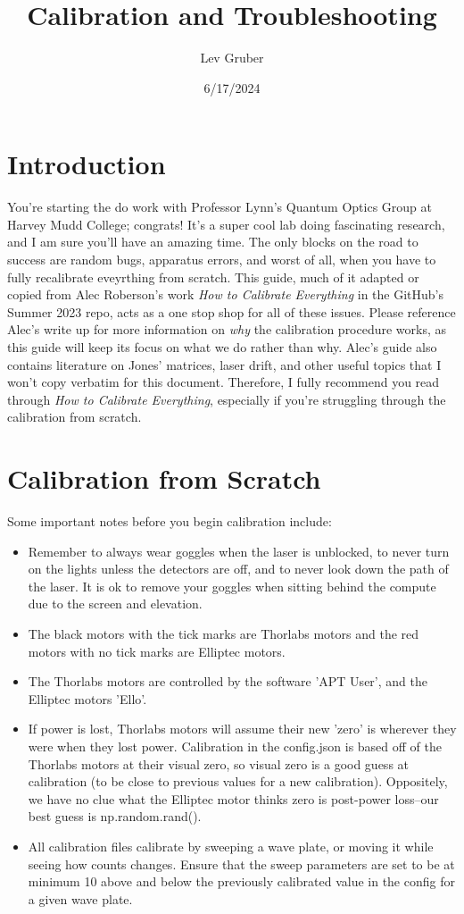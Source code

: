 \documentclass{paper}[11pt]
\title{Calibration and Troubleshooting}
\author{Lev Gruber}
\date{6/17/2024}
\begin{document}
\maketitle 

\tableofcontents
\newpage
\section{Introduction}
You're starting the do work with Professor Lynn's Quantum Optics Group at Harvey Mudd College; congrats! It's a super cool lab doing fascinating research, and I am sure you'll have an amazing time. The only blocks on the road to success are random bugs, apparatus errors, and worst of all, when you have to fully recalibrate eveyrthing from scratch. This guide, much of it adapted or copied from Alec Roberson's work \textit{How to Calibrate Everything} in the GitHub's Summer 2023 repo, acts as a one stop shop for all of these issues. Please reference Alec's write up for more information on \textit{why} the calibration procedure works, as this guide will keep its focus on what we do rather than why. Alec's guide also contains literature on Jones' matrices, laser drift, and other useful topics that I won't copy verbatim for this document. Therefore, I fully recommend you read through 
\textit{How to Calibrate Everything}, especially if you're struggling through the calibration from scratch.

\section{Calibration from Scratch}
Some important notes before you begin calibration include:
\begin{itemize}
    \item Remember to always wear goggles when the laser is unblocked, to never turn on the lights unless the detectors are off, and to never look down the path of the laser. It is ok to remove your goggles when sitting behind the compute due to the screen and elevation.
    \item The black motors with the tick marks are Thorlabs motors and the red motors with no tick marks are Elliptec motors.
    \item The Thorlabs motors are controlled by the software 'APT User', and the Elliptec motors 'Ello'.
    \item If power is lost, Thorlabs motors will assume their new 'zero' is wherever they were when they lost power. Calibration in the config.json is based off of the Thorlabs motors at their visual zero, so visual zero is a good guess at calibration (to be close to previous values for a new calibration). Oppositely, we have no clue what the Elliptec motor thinks zero is post-power loss--our best guess is np.random.rand().
    \item All calibration files calibrate by sweeping a wave plate, or moving it while seeing how counts changes. Ensure that the sweep parameters are set to be at minimum 10 above and below the previously calibrated value in the config for a given wave plate. 
\end{itemize}
\end{document}
